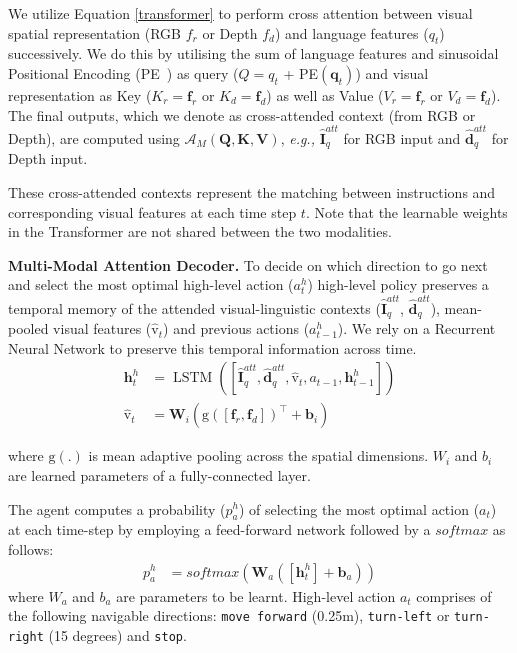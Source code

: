 \documentclass[letter, 10pt, conference]{ieeeconf}
\begin{document}
We utilize Equation \ref{transformer} to perform cross attention between visual spatial representation (RGB $f_{r}$ or Depth $f_{d}$) and language features ($q_{t}$) successively. We do this by utilising the sum of language features and sinusoidal Positional Encoding (PE~\cite{NIPS2017_7181}) as query ($Q = q_{t}$ + PE$(\boldsymbol{q}_{t})$) and visual representation as Key ($K_r = \boldsymbol{f}_{r}$ or $K_d = \boldsymbol{f}_{d}$) as well as Value ($V_r = \boldsymbol{f}_{r}$ or $V_d = \boldsymbol{f}_{d}$).
The final outputs, which we denote as cross-attended context (from RGB or Depth), are computed using $\mathcal{A}_{M}(\boldsymbol{Q}, \boldsymbol{K}, \boldsymbol{V})$, \textit{e.g.,} $\hat{\boldsymbol{I}}^{att}_{q}$ for RGB input and $\hat{\boldsymbol{d}}^{att}_{q}$ for Depth input.

These cross-attended contexts represent the matching between instructions and corresponding visual features at each time step $t$.
Note that the learnable weights in the Transformer are not shared between the two modalities. 

\textbf{Multi-Modal Attention Decoder.}
To decide on which direction to go next and select the most optimal high-level action ($a^{h}_{t}$) high-level policy preserves a temporal memory of the attended visual-linguistic contexts ($\hat{\boldsymbol{I}}^{att}_{q}$, $\hat{\boldsymbol{d}}^{att}_{q}$), mean-pooled visual features ($\hat{\mathrm{v}}_{t}$) and previous actions (${a}^{h}_{t-1}$). We rely on a Recurrent Neural Network to preserve this temporal information across time.
\begin{equation}
\begin{aligned}
\boldsymbol{h}^{h}_{t}&=\operatorname{LSTM}\left(\left[\hat{\boldsymbol{I}}^{att}_{q}, \hat{\boldsymbol{d}}^{att}_{q}, \hat{\boldsymbol{\mathrm{v}}}_{t}, {a}_{t-1}, \boldsymbol{h}^{h}_{t-1}\right]\right) \\
\hat{\boldsymbol{\mathrm{v}}}_{t}&=\boldsymbol{W}_{i}(\mathrm{g}( [\boldsymbol{f}_{r},\boldsymbol{f}_{d}])^\top+\boldsymbol{b}_{i})
\label{recurrence}
\end{aligned}
\end{equation}

where $\mathrm{g(.)}$ is mean adaptive pooling across the spatial dimensions. $W_{i}$ and $b_{i}$ are learned parameters of a fully-connected layer.

The agent computes a probability ($p^{h}_{a}$) of selecting the most optimal action ($a_{t}$) at each time-step by employing a feed-forward network followed by a $softmax$ as follows:
\begin{equation} \begin{aligned}
p^{h}_{a} &= softmax( \boldsymbol{W}_{a}([ \boldsymbol{h}^{h}_{t}] + \boldsymbol{b}_{a}))
\end{aligned}\end{equation}
where $W_{a}$ and $b_{a}$ are parameters to be learnt. High-level action $a_{t}$ comprises of the following navigable directions: \texttt{move forward} (0.25m), \texttt{turn-left} or \texttt{turn-right} (15 degrees) and \texttt{stop}.
\end{document}
